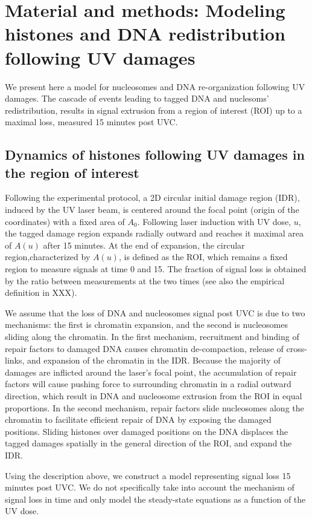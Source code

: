 \documentclass[12pt]{article}
\begin{document}
\section{Material and methods: Modeling  histones and DNA redistribution following UV damages}
We present here a model for nucleosomes and DNA re-organization following UV damages. The cascade of events leading to tagged DNA and nuclesoms'  redistribution, results in signal extrusion from a region of interest (ROI) up to a maximal loss, measured 15 minutes post UVC. 

\subsection{Dynamics of histones following UV damages in the region of interest}

Following the experimental protocol, a 2D circular initial damage region (IDR), induced by the UV laser beam, is centered around the focal point (origin of the coordinates) with a fixed area of $A_0$. Following laser induction with UV dose, $u$, the tagged damage region expands radially outward and reaches it maximal area of $A(u)$ after 15 minutes. At the end of expansion, the circular region,characterized by $A(u)$, is defined as the ROI, which remains a fixed region to measure signals at time 0 and 15. The fraction of signal loss is obtained by the ratio between measurements at the two times (see also the empirical definition in XXX). 

We assume that the loss of DNA and nucleosomes signal post UVC is due to two mechanisms: the first is chromatin expansion, and the second is nucleosomes sliding along the chromatin. In the first mechanism, recruitment and binding of repair factors to damaged DNA causes chromatin de-compaction, release of cross-links, and expansion of the chromatin in the IDR. Because the majority of damages are inflicted around the laser's focal point, the accumulation of repair factors will cause pushing force to surrounding chromatin in a radial outward direction, which result in DNA and nucleosome extrusion from the ROI in equal proportions. In the second mechanism, repair factors slide nucleosomes along the chromatin to facilitate efficient repair of DNA by exposing the damaged positions. 
Sliding histones over damaged positions on the DNA displaces the tagged damages spatially in the general direction of the ROI, and expand the IDR. 
 
Using the description above, we construct a model representing signal loss 15 minutes post UVC. We do not specifically take into account the mechanism of signal loss in time and only model the steady-state equations as a function of the UV dose.
\end{document}
